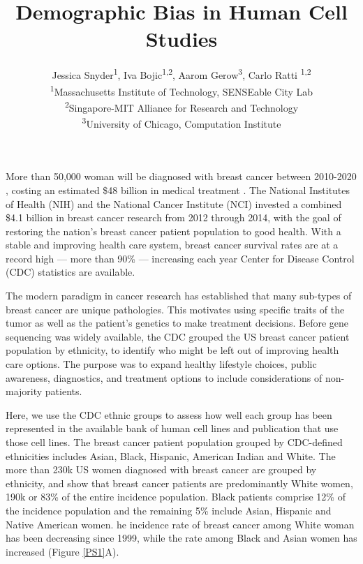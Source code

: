 \documentclass[11pt]{article}
\begin{document}
\title{Demographic Bias in Human Cell Studies }
\author{Jessica Snyder\textsuperscript{1}, Iva Bojic\textsuperscript{1,2}, Aarom Gerow\textsuperscript{3}, Carlo Ratti  \textsuperscript{1,2 } \\ \textsuperscript{1}Massachusetts Institute of Technology, SENSEable City Lab \\ \textsuperscript{2}Singapore-MIT Alliance for Research and Technology \\  \textsuperscript{3}University of Chicago, Computation Institute }

\maketitle 

More than 50,000 woman will be diagnosed with breast cancer between 2010-2020 , costing an estimated \$48 billion in medical treatment \cite{mariotto2011projections, weir2015past}. The National Institutes of Health (NIH) and the National Cancer Institute (NCI) invested a combined \$4.1 billion in breast cancer research from 2012 through 2014, with the goal of restoring the nation's breast cancer patient population to good health. With a stable and improving health care system, breast cancer survival rates are at a record high --- more than 90\% --- increasing each year Center for Disease Control (CDC) statistics are available. 

The modern paradigm in cancer research has established that many sub-types of breast cancer are unique pathologies. This motivates using specific traits of the tumor as well as the patient's genetics to make treatment decisions.  Before gene sequencing was widely available, the CDC grouped the US breast cancer patient population by ethnicity, to identify who might be left out of improving health care options. The purpose was to expand healthy lifestyle choices, public awareness, diagnostics, and treatment options to include considerations of non-majority patients. 

Here, we use the CDC ethnic groups to assess how well each group has been represented in the available bank of human cell lines and publication that use those cell lines. The breast cancer patient population grouped by CDC-defined ethnicities includes Asian, Black, Hispanic, American Indian and White. The more than 230k US women diagnosed with breast cancer are grouped by ethnicity, and show that breast cancer patients are predominantly White women, 190k or 83\% of the entire incidence population. Black patients comprise 12\% of the incidence population and the remaining 5\% include Asian, Hispanic and Native American women. he incidence rate of breast cancer among White woman has been decreasing since 1999, while  the rate among Black and Asian women has increased (Figure \ref{PS1}A).
\end{document}
